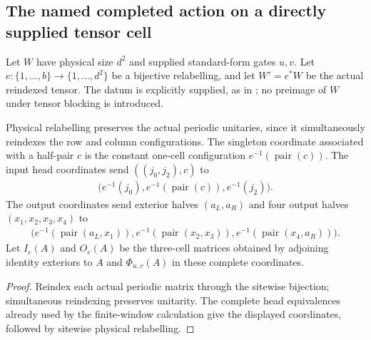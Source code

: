 \subsection{The named completed action on a directly supplied tensor cell}
\label{sec:mpu_supplied_completed_local_action}

Let $W$ have physical size $d^2$ and supplied standard-form gates $u,v$.
Let $e:\{1,\ldots,b\}\to\{1,\ldots,d^2\}$ be a bijective relabelling,
and let $W'=e^*W$ be the actual reindexed tensor. The datum is explicitly
supplied, as in \cite{gap:mpu_qca_complete_block_heisenberg_scope}; no
preimage of $W$ under tensor blocking is introduced.

\begin{lemma}
    \label{lem:mpu_supplied_relabel_coordinates}
    \notready
    Physical relabelling preserves the actual periodic unitaries, since
    it simultaneously reindexes the row and column configurations.
    The singleton coordinate associated with a half-pair $c$ is the
    constant one-cell configuration $e^{-1}(\operatorname{pair}(c))$.
    The input head coordinates send $((j_0,j_2),c)$ to
    \begin{align}
        \bigl(e^{-1}(j_0),e^{-1}(\operatorname{pair}(c)),e^{-1}(j_2)\bigr).
    \end{align}
    The output coordinates send exterior halves $(a_L,a_R)$ and four
    output halves $(x_1,x_2,x_3,x_4)$ to
    \begin{align}
        \bigl(e^{-1}(\operatorname{pair}(a_L,x_1)),
        e^{-1}(\operatorname{pair}(x_2,x_3)),
        e^{-1}(\operatorname{pair}(x_4,a_R))\bigr).
    \end{align}
    Let $I_e(A)$ and $O_e(A)$ be the three-cell matrices obtained by
    adjoining identity exteriors to $A$ and $\Phi_{u,v}(A)$ in these
    complete coordinates.
\end{lemma}
\begin{proof}
    \notready
    Reindex each actual periodic matrix through the sitewise bijection;
    simultaneous reindexing preserves unitarity. The complete head
    equivalences already used by the finite-window calculation give the
    displayed coordinates, followed by sitewise physical relabelling.
\end{proof}

